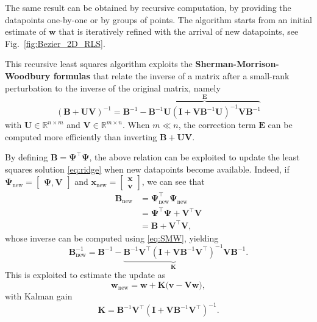 \documentclass[10pt,a4paper]{article} %
\newcommand{\trsp}{{\scriptscriptstyle\top}}
\newcommand{\new}{{\!\scriptscriptstyle\mathrm{new}}}
\begin{document}
The same result can be obtained by recursive computation, by providing the datapoints one-by-one or by groups of points. The algorithm starts from an initial estimate of $\bm{w}$ that is iteratively refined with the arrival of new datapoints, see Fig.~\ref{fig:Bezier_2D_RLS}.

This recursive least squares algorithm exploits the \textbf{Sherman-Morrison-Woodbury formulas} that relate the inverse of a matrix after a small-rank perturbation to the inverse of the original matrix, namely
\begin{equation}
	\left(\bm{B}+\bm{U}\bm{V}\right)^{-1} =
	\bm{B}^{-1} - \overbrace{\bm{B}^{-1}\bm{U} \left(\bm{I}+\bm{V}\bm{B}^{-1}\bm{U}\right)^{-1} \bm{V}\bm{B}^{-1}}^{\bm{E}}
	\label{eq:SMW}
\end{equation}
with $\bm{U}\!\in\!\mathbb{R}^{n\times m}$ and $\bm{V}\!\in\!\mathbb{R}^{m\times n}$. When $m\!\ll\!n$, the correction term $\bm{E}$ can be computed more efficiently than inverting $\bm{B}+\bm{U}\bm{V}$.

By defining $\bm{B}\!=\!\bm{\Psi}^\trsp\bm{\Psi}$, the above relation can be exploited to update the least squares solution \eqref{eq:ridge} when new datapoints become available. Indeed, if $\bm{\Psi}_\new = \begin{bmatrix}\bm{\Psi}, \bm{V}\end{bmatrix}$ and  $\bm{x}_\new = \begin{bmatrix}\bm{x}\\\bm{v}\end{bmatrix}$, we can see that
\begin{align}
	\bm{B}_\new
	&= \bm{\Psi}_\new^\trsp \bm{\Psi}_\new \\
	&= \bm{\Psi}^\trsp \bm{\Psi} + \bm{V}^\trsp \bm{V} \\
	&= \bm{B} + \bm{V}^\trsp \bm{V},
\end{align}
whose inverse can be computed using \eqref{eq:SMW}, yielding
\begin{equation}
	\bm{B}_\new^{-1} =
	\bm{B}^{-1} - \underbrace{\bm{B}^{-1}\bm{V}^\trsp \left(\bm{I}+\bm{V}\bm{B}^{-1}\bm{V}^\trsp\right)^{-1}}_{\bm{K}} \bm{V}\bm{B}^{-1}.
\end{equation}
This is exploited to estimate the update as
\begin{equation}
	\bm{w}_\new = \bm{w} + \bm{K} \Big( \bm{v} - \bm{V} \bm{w} \Big),
\end{equation}
with Kalman gain 
\begin{equation}
	\bm{K} = \bm{B}^{-1}\bm{V}^\trsp \left(\bm{I}+\bm{V}\bm{B}^{-1}\bm{V}^\trsp\right)^{-1}.
\end{equation}
\end{document}
